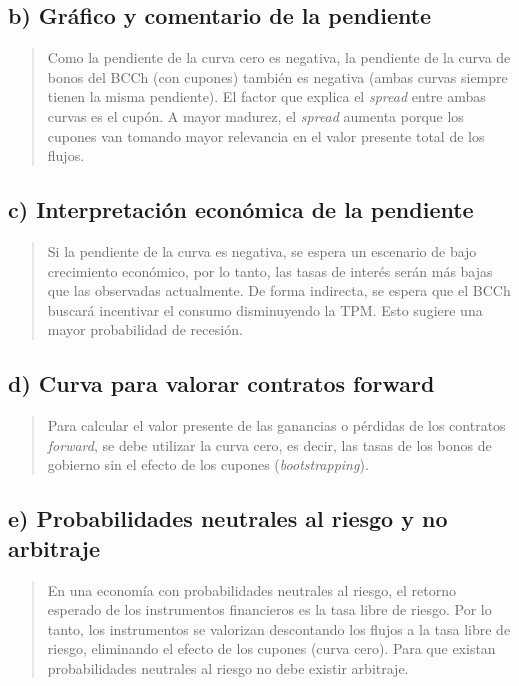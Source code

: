 \documentclass[12pt]{article}
\begin{document}
\subsection*{b) Gráfico y comentario de la pendiente}

\begin{quote}
Como la pendiente de la curva cero es negativa, la pendiente de la curva de bonos del BCCh (con cupones) también es negativa (ambas curvas siempre tienen la misma pendiente). El factor que explica el \textit{spread} entre ambas curvas es el cupón. A mayor madurez, el \textit{spread} aumenta porque los cupones van tomando mayor relevancia en el valor presente total de los flujos.
\end{quote}

\subsection*{c) Interpretación económica de la pendiente}

\begin{quote}
Si la pendiente de la curva es negativa, se espera un escenario de bajo crecimiento económico, por lo tanto, las tasas de interés serán más bajas que las observadas actualmente. De forma indirecta, se espera que el BCCh buscará incentivar el consumo disminuyendo la TPM. Esto sugiere una mayor probabilidad de recesión.
\end{quote}

\subsection*{d) Curva para valorar contratos forward}

\begin{quote}
Para calcular el valor presente de las ganancias o pérdidas de los contratos \textit{forward}, se debe utilizar la curva cero, es decir, las tasas de los bonos de gobierno sin el efecto de los cupones (\textit{bootstrapping}).
\end{quote}

\subsection*{e) Probabilidades neutrales al riesgo y no arbitraje}

\begin{quote}
En una economía con probabilidades neutrales al riesgo, el retorno esperado de los instrumentos financieros es la tasa libre de riesgo. Por lo tanto, los instrumentos se valorizan descontando los flujos a la tasa libre de riesgo, eliminando el efecto de los cupones (curva cero). Para que existan probabilidades neutrales al riesgo no debe existir arbitraje.
\end{quote}
\end{document}
